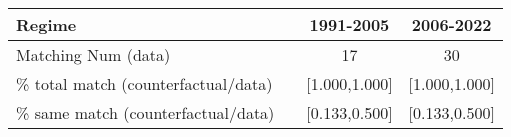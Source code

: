 
\begin{tabular}[t]{lccc}
\toprule
Regime &  & 1991-2005 & 2006-2022\\
\midrule
Matching Num (data) &  & 17 & 30\\
\% total match (counterfactual/data) &  & {}[1.000,1.000] & {}[1.000,1.000]\\
\% same match (counterfactual/data) &  & {}[0.133,0.500] & {}[0.133,0.500]\\
\bottomrule
\end{tabular}
